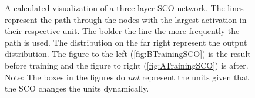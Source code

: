 \begin{figure}[H]
    \caption[A calculated visualization of the activation of a three layer \acs{SCO} network, after training and displaying the
    signal and background separately.]{A calculated visualization of a three layer \acs{SCO} network. The lines represent the path 
    through the nodes with the largest activation in their respective unit. The bolder the line the more frequently the path is used. 
    The distribution on the far right represent the output distribution. The figure to the left (\ref{fig:BTrainingSCO}) is the result 
    before training and the figure to right (\ref{fig:ATrainingSCO}) is after. Note: The boxes in the figures do \emph{not} represent the units 
    given that the \ac{SCO} changes the units dynamically.} 
    \label{fig:NetDistSCO}
\end{figure}
